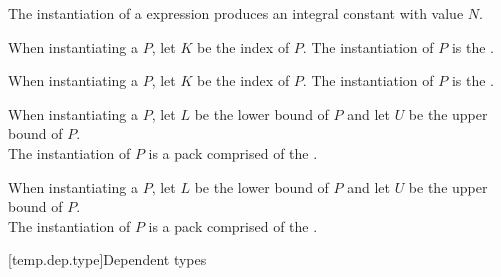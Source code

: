 \documentclass{wg21}
\begin{document}
\pnum
The instantiation of a  expression  produces
an integral constant with value $N$.

\pnum

When instantiating a  $P$,
let $K$ be the index of $P$.
The instantiation of $P$ is the  .


When instantiating a  $P$,
let $K$ be the index of $P$.
The instantiation of $P$ is the  .

\begin{addedblock}

When instantiating a  $P$,
let $L$ be the lower bound of $P$ and let $U$ be the upper bound of $P$.\\
The instantiation of $P$ is a pack comprised of the  .

When instantiating a  $P$,
let $L$ be the lower bound of $P$ and let $U$ be the upper bound of $P$.\\
The instantiation of $P$ is a pack comprised of the  .

\end{addedblock}


[temp.dep.type]{Dependent types}

\end{document}
